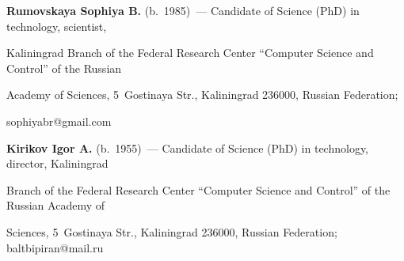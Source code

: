    

   \noindent

   \textbf{Rumovskaya Sophiya B.} (b.\ 1985)~--- Candidate of Science (PhD) in technology, scientist, 

Kaliningrad Branch of the Federal Research Center ``Computer Science and Control'' of the Russian 

Academy of Sciences, 5~Gostinaya Str., Kaliningrad 236000, Russian Federation; 

\mbox{sophiyabr@gmail.com}

   


   

   \noindent

   \textbf{Kirikov Igor A.} (b.\ 1955)~--- Candidate of Science (PhD) in technology, director, Kaliningrad 

Branch of the Federal Research Center ``Computer Science and Control'' of the Russian Academy of 

Sciences, 5~Gostinaya Str., Kaliningrad 236000, Russian Federation; \mbox{baltbipiran@mail.ru}

    

  \label{end\stat}



\renewcommand{\bibname}{\protect\rm Литература} 

